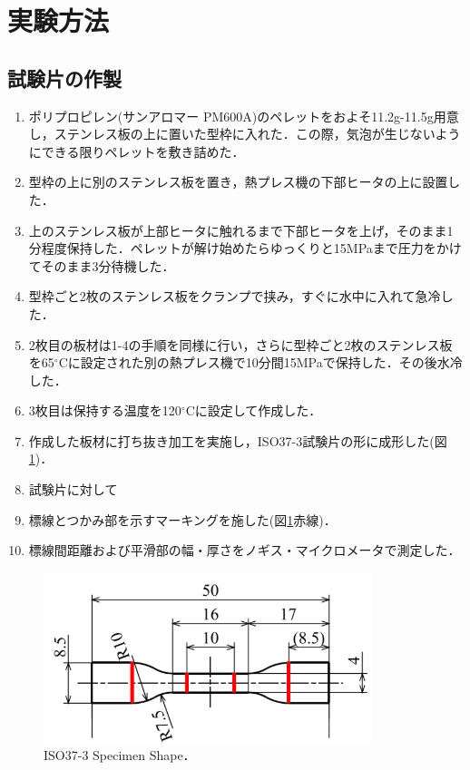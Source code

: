 \section{実験方法}

\subsection{試験片の作製}

\begin{enumerate}
    \item ポリプロピレン(サンアロマー PM600A)のペレットをおよそ11.2g-11.5g用意し，ステンレス板の上に置いた型枠に入れた．この際，気泡が生じないようにできる限りペレットを敷き詰めた．
    \item 型枠の上に別のステンレス板を置き，熱プレス機の下部ヒータの上に設置した．
    \item 上のステンレス板が上部ヒータに触れるまで下部ヒータを上げ，そのまま1分程度保持した．ペレットが解け始めたらゆっくりと15MPaまで圧力をかけてそのまま3分待機した．
    \item 型枠ごと2枚のステンレス板をクランプで挟み，すぐに水中に入れて急冷した．
    \item 2枚目の板材は1-4の手順を同様に行い，さらに型枠ごと2枚のステンレス板を65$^\circ$Cに設定された別の熱プレス機で10分間15MPaで保持した．その後水冷した．
    \item 3枚目は保持する温度を120$^\circ$Cに設定して作成した．
    \item 作成した板材に打ち抜き加工を実施し，ISO37-3試験片の形に成形した(図\ref{fig:試験片})．
    \item 試験片に対して
    \item 標線とつかみ部を示すマーキングを施した(図\ref{fig:試験片}赤線)．
    \item 標線間距離および平滑部の幅・厚さをノギス・マイクロメータで測定した．
\end{enumerate}

\begin{figure}[htbp]
    \centering %
    \includegraphics[width=100truemm,clip]{fig/fig_試験片.png}
    \caption{ISO37-3 Specimen Shape．}
    \label{fig:試験片}
\end{figure}

